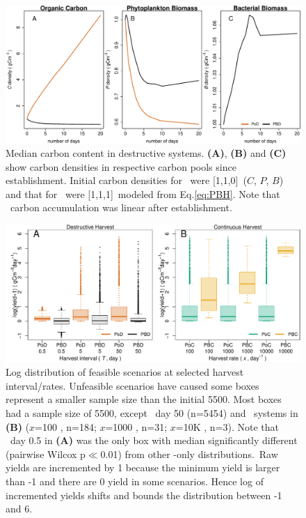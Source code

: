 \documentclass[env.tex]{subfiles}
\begin{document}
\begin{figure}[H]
    \centering
    \includegraphics[width=\linewidth]{result/Sample.pdf}
    \caption[Median carbon content in destructive systems]{Median carbon content in destructive systems.  \textbf{(A)}, \textbf{(B)} and \textbf{(C)} show carbon densities in respective carbon pools since establishment.  Initial carbon densities for \PoN\ were [1,1,0]\den\ ($C$, $P$, $B$) and that for \PBN\ were [1,1,1]\den\ modeled from Eq.\ref{eq:PBH}.  Note that \PoN\ carbon accumulation was linear after establishment.}
    \label{f:destCarbon}
\end{figure}

\begin{figure}[H]
    \centering
    \includegraphics[width=\linewidth]{result/Harvest.pdf}
    \caption[Yield flux distribution by harvest mode]{Log distribution of feasible scenarios at selected harvest interval/rates.  Unfeasible scenarios have caused some boxes represent a smaller sample size than the initial 5500.  Most boxes had a sample size of 5500, except \PBN\ day 50 (n=5454) and \PBH\ systems in \textbf{(B)} ($x$=100 \dayU, n=184; $x$=1000 \dayU, n=31; $x$=10K \dayU, n=3).  Note that \PoN\ day 0.5 in \textbf{(A)} was the only box with median significantly different (pairwise Wilcox p$\ll$0.01) from other \phy-only distributions.\pAExplain\  Raw yields are incremented by 1 because the minimum yield is larger than -1 and there are 0 yield in some scenarios.  Hence log of incremented yields shifts and bounds the distribution between -1 and 6.}
    \label{f:ydByHarv}
\end{figure}
\end{document}

